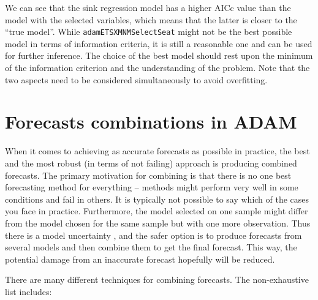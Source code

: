 \documentclass[]{book}
\theoremstyle{definition}
\theoremstyle{definition}
\theoremstyle{definition}
\theoremstyle{definition}
\theoremstyle{remark}
\begin{document}
We can see that the sink regression model has a higher AICc value than the model with the selected variables, which means that the latter is closer to the ``true model''. While \texttt{adamETSXMNMSelectSeat} might not be the best possible model in terms of information criteria, it is still a reasonable one and can be used for further inference. The choice of the best model should rest upon the minimum of the information criterion and the understanding of the problem. Note that the two aspects need to be considered simultaneously to avoid overfitting.

\hypertarget{ADAMCombinations}{%
\section{Forecasts combinations in ADAM}\label{ADAMCombinations}}

When it comes to achieving as accurate forecasts as possible in practice, the best and the most robust (in terms of not failing) approach is producing combined forecasts. The primary motivation for combining is that there is no one best forecasting method for everything -- methods might perform very well in some conditions and fail in others. It is typically not possible to say which of the cases you face in practice. Furthermore, the model selected on one sample might differ from the model chosen for the same sample but with one more observation. Thus there is a model uncertainty \citep[as defined by][]{Chatfield1996}, and the safer option is to produce forecasts from several models and then combine them to get the final forecast. This way, the potential damage from an inaccurate forecast hopefully will be reduced.

There are many different techniques for combining forecasts. The non-exhaustive list includes:
\end{document}

